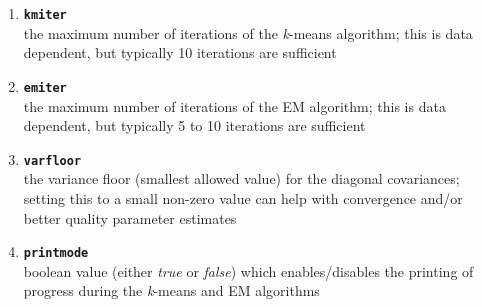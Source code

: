 \documentclass[10pt,a4paper]{article}
\def\_{{\tt\char95}}
\begin{document}
\begin{small}
\begin{enumerate}[{$\bullet$}]
\begin{small}
\begin{enumerate}[{-}]
\item
{\tt\bfseries km\_iter}\\
the maximum number of iterations of the {\it k}-means algorithm; this is data dependent, but typically 10 iterations are sufficient

\item
{\tt\bfseries em\_iter}\\
the maximum number of iterations of the EM algorithm; this is data dependent, but typically 5 to 10 iterations are sufficient

\item
{\tt\bfseries var\_floor}\\
the variance floor (smallest allowed value) for the diagonal covariances; setting this to a small non-zero value can help with convergence and/or better quality parameter estimates

\item
{\tt\bfseries print\_mode}\\
boolean value (either {\it true} or {\it false}) which enables/disables the printing of progress during the {\it k}-means and EM algorithms 

\end{enumerate}
\end{small}

\end{enumerate}
\end{small}
\end{document}
